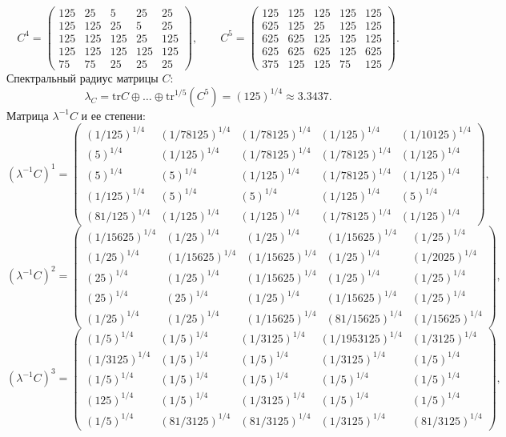 $$C^4 = \begin{pmatrix}
125 & 25 & 5 & 25 & 25\\
125 & 125 & 25 & 5 & 25\\
125 & 125 & 125 & 25 & 125\\
125 & 125 & 125 & 125 & 125\\
75 & 75 & 25 & 25 & 25
\end{pmatrix},
\qquad
C^5 = \begin{pmatrix}
125 & 125 & 125 & 125 & 125\\
625 & 125 & 25 & 125 & 125\\
625 & 625 & 125 & 125 & 125\\
625 & 625 & 625 & 125 & 625\\
375 & 125 & 125 & 75 & 125
\end{pmatrix}.
$$
Спектральный радиус матрицы $C$:
$$\lambda_{C} = \mathrm{tr}C\oplus \dots \oplus \mathrm{tr}^{1/5}(C^{5}) = (125)^{1/4} \approx 3.3437.$$
Матрица $\lambda^{-1}C$ и ее степени:
$$(\lambda^{-1}C)^1 = \begin{pmatrix}
(1/125)^{1/4} & (1/78125)^{1/4} & (1/78125)^{1/4} & (1/125)^{1/4} & (1/10125)^{1/4}\\
(5)^{1/4} & (1/125)^{1/4} & (1/78125)^{1/4} & (1/78125)^{1/4} & (1/125)^{1/4}\\
(5)^{1/4} & (5)^{1/4} & (1/125)^{1/4} & (1/78125)^{1/4} & (1/125)^{1/4}\\
(1/125)^{1/4} & (5)^{1/4} & (5)^{1/4} & (1/125)^{1/4} & (5)^{1/4}\\
(81/125)^{1/4} & (1/125)^{1/4} & (1/125)^{1/4} & (1/78125)^{1/4} & (1/125)^{1/4}
\end{pmatrix},
$$
$$(\lambda^{-1}C)^2 = \begin{pmatrix}
(1/15625)^{1/4} & (1/25)^{1/4} & (1/25)^{1/4} & (1/15625)^{1/4} & (1/25)^{1/4}\\
(1/25)^{1/4} & (1/15625)^{1/4} & (1/15625)^{1/4} & (1/25)^{1/4} & (1/2025)^{1/4}\\
(25)^{1/4} & (1/25)^{1/4} & (1/15625)^{1/4} & (1/25)^{1/4} & (1/25)^{1/4}\\
(25)^{1/4} & (25)^{1/4} & (1/25)^{1/4} & (1/15625)^{1/4} & (1/25)^{1/4}\\
(1/25)^{1/4} & (1/25)^{1/4} & (1/15625)^{1/4} & (81/15625)^{1/4} & (1/15625)^{1/4}
\end{pmatrix},
$$
$$(\lambda^{-1}C)^3 = \begin{pmatrix}
(1/5)^{1/4} & (1/5)^{1/4} & (1/3125)^{1/4} & (1/1953125)^{1/4} & (1/3125)^{1/4}\\
(1/3125)^{1/4} & (1/5)^{1/4} & (1/5)^{1/4} & (1/3125)^{1/4} & (1/5)^{1/4}\\
(1/5)^{1/4} & (1/5)^{1/4} & (1/5)^{1/4} & (1/5)^{1/4} & (1/5)^{1/4}\\
(125)^{1/4} & (1/5)^{1/4} & (1/3125)^{1/4} & (1/5)^{1/4} & (1/5)^{1/4}\\
(1/5)^{1/4} & (81/3125)^{1/4} & (81/3125)^{1/4} & (1/3125)^{1/4} & (81/3125)^{1/4}
\end{pmatrix},
$$
